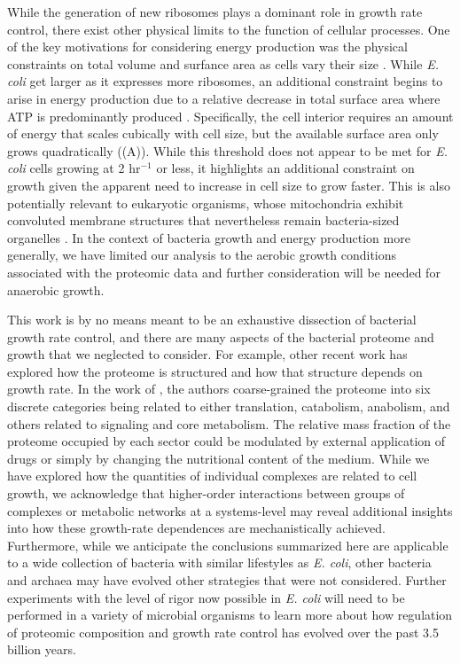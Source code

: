 While the generation of new ribosomes plays a dominant role in growth rate
control, there exist other physical limits to the function of cellular
processes. One of the key motivations for considering energy production was the
physical constraints on total volume and surfance area as cells vary their size
\citep{harris2018, ojkic2019}. While \textit{E. coli} get larger as it expresses
more ribosomes, an additional constraint begins to arise in energy production
due to a relative decrease in total surface area where ATP is predominantly
produced \citep{szenk2017}. Specifically, the cell interior requires an amount
of energy that scales cubically with cell size, but the available surface area
only grows quadratically ((A)). While this threshold does
not appear to be met for \textit{E. coli} cells growing at 2 hr$^{-1}$ or less,
it highlights an additional constraint on growth given the apparent need to
increase in cell size to grow faster. This is also potentially relevant to
eukaryotic organisms, whose mitochondria exhibit convoluted membrane structures
that nevertheless remain bacteria-sized organelles \citep{guo2018}. In the
context of bacteria growth and energy production more generally, we have limited
our analysis to the aerobic growth conditions associated with the proteomic data
and further consideration will be needed for anaerobic growth.

This work is by no means meant to be an exhaustive dissection of bacterial
growth rate control, and there are many aspects of the bacterial proteome and
growth that we neglected to consider. For example, other recent work
\citep{liebermeister2014, hui2015, schmidt2016} has explored how the proteome is
structured and how that structure depends on growth rate. In the work of
\cite{hui2015}, the authors coarse-grained the proteome into six discrete
categories being related to either translation, catabolism, anabolism, and
others related to signaling and core metabolism. The relative mass fraction of
the proteome occupied by each sector could be modulated by external application
of drugs or simply by changing the nutritional content of the medium. While we
have explored how the quantities of individual complexes are related to cell
growth, we acknowledge that higher-order interactions between groups of
complexes or metabolic networks at a systems-level may reveal additional
insights into how these growth-rate dependences  are mechanistically achieved.
Furthermore, while we anticipate the conclusions summarized here are applicable
to a wide collection of bacteria with similar lifestyles as \textit{E. coli},
other bacteria and archaea may have evolved other strategies that were not
considered. Further experiments with the level of rigor now possible in
\textit{E. coli} will need to be performed in a variety of microbial organisms
to learn more about how regulation of proteomic composition and  growth rate
control has evolved over the past 3.5 billion years.

